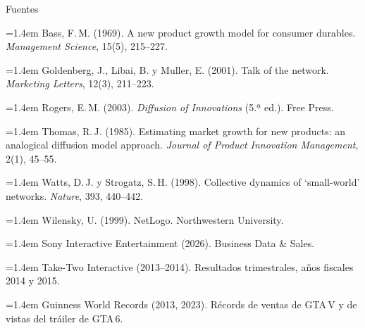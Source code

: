 \documentclass[aspectratio=169,11pt,notes=only]{beamer}
\newcommand{\seccion}{}
\newcommand{\referencia}[1]{\par\hangindent=1.4em\hangafter=1 #1\par}
\begin{document}
\renewcommand{\seccion}{Referencias}
\begin{frame}{Fuentes}
  \vskip0.5mm
  \raggedright\fontsize{8}{9.6}\selectfont
  \setlength{\parskip}{1.1mm}
  \referencia{Bass, F.\,M. (1969). A new product growth model for consumer durables. \textit{Management Science}, 15(5), 215--227.}
  \referencia{Goldenberg, J., Libai, B. y Muller, E. (2001). Talk of the network. \textit{Marketing Letters}, 12(3), 211--223.}
  \referencia{Rogers, E.\,M. (2003). \textit{Diffusion of Innovations} (5.ª ed.). Free Press.}
  \referencia{Thomas, R.\,J. (1985). Estimating market growth for new products: an analogical diffusion model approach. \textit{Journal of Product Innovation Management}, 2(1), 45--55.}
  \referencia{Watts, D.\,J. y Strogatz, S.\,H. (1998). Collective dynamics of `small-world' networks. \textit{Nature}, 393, 440--442.}
  \referencia{Wilensky, U. (1999). NetLogo. Northwestern University.}
  \referencia{Sony Interactive Entertainment (2026). Business Data \& Sales.}
  \referencia{Take-Two Interactive (2013--2014). Resultados trimestrales, años fiscales 2014 y 2015.}
  \referencia{Guinness World Records (2013, 2023). Récords de ventas de GTA\,V y de vistas del tráiler de GTA\,6.}
\end{frame}
\end{document}
